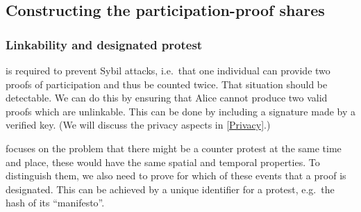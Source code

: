\subsection{Constructing the participation-proof shares}

\subsubsection{Linkability and designated protest}

 is required to prevent Sybil attacks, i.e.\ that one 
individual can provide two proofs of participation and thus be counted twice.
That situation should be detectable.
We can do this by ensuring that Alice cannot produce two valid proofs which
are unlinkable.
This can be done by including a signature made by a verified key.
(We will discuss the privacy aspects in \cref{Privacy}.)

 focuses on the problem that there might be a counter 
protest at the same time and place, these would have the same spatial and 
temporal properties.
To distinguish them, we also need to prove for which of these events that a 
proof is designated.
This can be achieved by a unique identifier for a protest, e.g.\ the hash of 
its \enquote{manifesto}.

